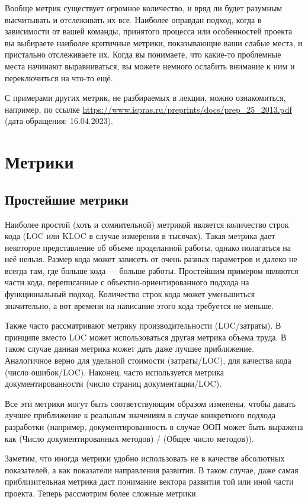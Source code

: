 \documentclass{../../text-style}
\begin{document}
Вообще метрик существует огромное количество, и вряд ли будет разумным высчитывать и отслеживать их все. Наиболее оправдан подход, когда в зависимости от вашей команды, принятого процесса или особенностей проекта вы выбираете наиболее критичные метрики, показывающие ваши слабые места, и пристально отслеживаете их. Когда вы понимаете, что какие-то проблемные места начинают выравниваться, вы можете немного ослабить внимание к ним и переключиться на что-то ещё. 

С примерами других метрик, не разбираемых в лекции, можно ознакомиться, например, по ссылке \url{https://www.ispras.ru/preprints/docs/prep_25_2013.pdf} (дата обращения: 16.04.2023).

\section{Метрики}

\subsection{Простейшие метрики}

Наиболее простой (хоть и сомнительной) метрикой является количество строк кода (LOC или KLOC в случае измерения в тысячах). Такая метрика дает некоторое представление об объеме проделанной работы, однако полагаться на неё нельзя. Размер кода может зависеть от очень разных параметров и далеко не всегда там, где больше кода --- больше работы. Простейшим примером являются части кода, переписанные с объектно-ориентированного подхода на функциональный подход. Количество строк кода может уменьшиться значительно, а вот времени на написание этого кода требуется не меньше.

Также часто рассматривают метрику производительности (LOC/затраты). В принципе вместо LOC может использоваться другая метрика объема труда. В таком случае данная метрика может дать даже лучшее приближение. Аналогичное верно для удельной стоимости (затраты/LOC), для качества кода (число ошибок/LOC). Наконец, часто используется метрика документированности (число страниц документации/LOC).

Все эти метрики могут быть соответствующим образом изменены, чтобы давать лучшее приближение к реальным значениям в случае конкретного подхода разработки (например, документированность в случае ООП может быть выражена как (Число документированных методов) / (Общее число методов)).

Заметим, что иногда метрики удобно использовать не в качестве абсолютных показателей, а как показатели направления развития. В таком случае, даже самая приблизительная метрика даст понимание вектора развития той или иной части проекта.
Теперь рассмотрим более сложные метрики.
\end{document}
